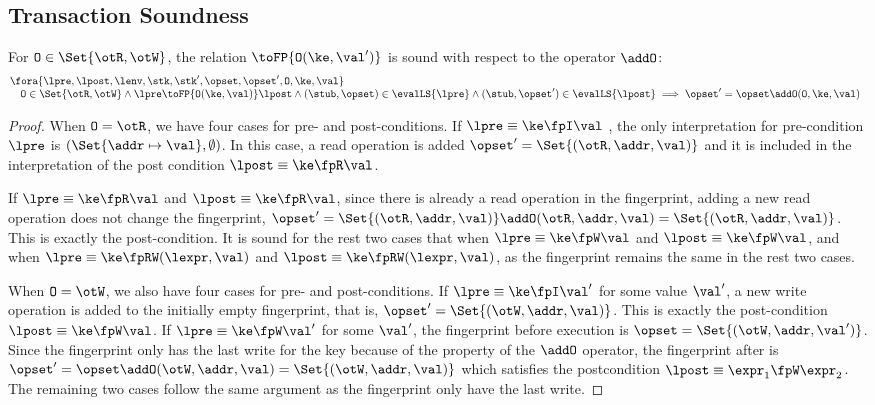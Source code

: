 \subsection{Transaction Soundness}

\begin{lemma}
\label{lem:appendix-fingerprint-op}
For \( \mathtt{O} \in \Set{\otR, \otW} \), the relation \( \toFP{\mathtt{O}(\ke,\val')}\) is sound with respect to the operator \( \addO \):
\[
\begin{array}{@{}l}
    \fora{\lpre, \lpost, \lenv, \stk, \stk', \opset, \opset', \mathtt{O}, \ke, \val} \\
    \quad \mathtt{O} \in \Set{\otR, \otW} 
    \land \lpre \toFP{\mathtt{O}(\ke,\val)} \lpost
    \land (\stub, \opset) \in \evalLS{\lpre}
    \land (\stub, \opset') \in \evalLS{\lpost}
    \implies \opset' = \opset \addO (\mathtt{O}, \ke, \val)
\end{array}
\]
\end{lemma}
\begin{proof}
When \( \mathtt{O} = \otR\), we have four cases for pre- and post-conditions.
If \( \lpre \equiv \ke \fpI \val \) , the only interpretation for pre-condition \( \lpre \) is \( (\Set{\addr \mapsto \val}, \emptyset) \).
In this case, a read operation is added \( \opset' = \Set{(\otR, \addr, \val)} \) and it is included in the interpretation of the post condition \( \lpost \equiv \ke \fpR \val \).

If \( \lpre \equiv \ke \fpR \val \) and \( \lpost \equiv \ke \fpR \val \), 
since there is already a read operation in the fingerprint, adding a new read operation does not change the fingerprint, \ie \( \opset' = \Set{(\otR, \addr, \val)} \addO (\otR, \addr, \val ) = \Set{(\otR, \addr, \val)} \).
This is exactly the post-condition.
It is sound for the rest two cases that  when \( \lpre \equiv \ke \fpW \val \) and \( \lpost \equiv \ke \fpW \val \), and when \( \lpre \equiv \ke \fpRW (\lexpr,\val) \) and \( \lpost \equiv \ke \fpRW (\lexpr,\val) \), as the fingerprint remains the same in the rest two cases.

When \( \mathtt{O} = \otW\), we also have four cases for pre- and post-conditions.
If \( \lpre \equiv \ke \fpI \val' \) for some value \( \val' \), a new write operation is added to the initially empty fingerprint, that is, \( \opset' = \Set{(\otW, \addr, \val)}\).
This is exactly the post-condition \( \lpost \equiv \ke \fpW \val \).
If \( \lpre \equiv \ke \fpW \val' \) for some \( \val' \), the fingerprint before execution is \( \opset = \Set{(\otW, \addr, \val')}\).
Since the fingerprint only has the last write for the key because of the property of the \( \addO \) operator,
the fingerprint after is \( \opset' = \opset \addO (\otW, \addr, \val) = \Set{(\otW, \addr, \val)}\) which satisfies the postcondition \( \lpost \equiv \expr_{1} \fpW \expr_{2} \).
The remaining two cases follow the same argument as the fingerprint only have the last write.
\end{proof}


